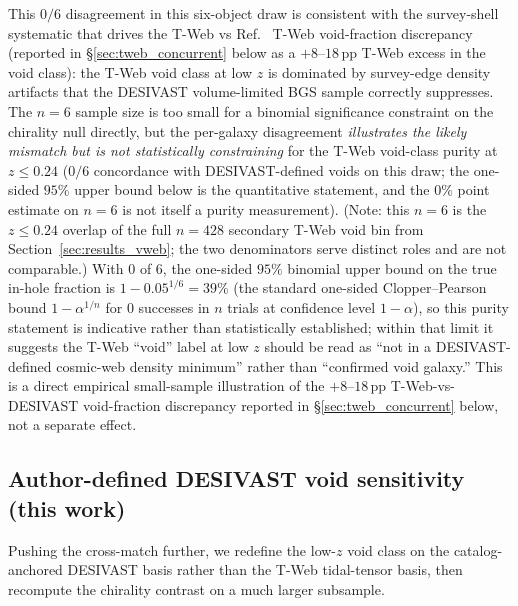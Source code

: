 \documentclass[aps,prd,twocolumn,superscriptaddress,showpacs,preprintnumbers,nofootinbib,longbibliography,floatfix]{revtex4-2}
\begin{document}
This $0/6$ disagreement in this six-object draw is consistent with the survey-shell systematic
that drives the T-Web vs Ref.~\cite{TWebDESI2026} T-Web void-fraction discrepancy
(reported in \S\ref{sec:tweb_concurrent} below as a
$+8$--$18\,$pp T-Web excess in the void class):
the T-Web void class at low $z$ is dominated by
survey-edge density artifacts that the DESIVAST volume-limited BGS
sample correctly suppresses. The $n = 6$ sample size is too small for
a binomial significance constraint on the chirality null directly, but
the per-galaxy disagreement \emph{illustrates the likely mismatch but is
not statistically constraining} for the T-Web void-class purity at
$z \leq 0.24$ ($0/6$ concordance with DESIVAST-defined voids on this
draw; the one-sided $95\%$ upper bound below is the quantitative
statement, and the $0\%$ point estimate on $n=6$ is not itself a purity
measurement). (Note: this $n=6$ is the $z \leq 0.24$ overlap of the full
$n=428$ secondary T-Web void bin from
Section~\ref{sec:results_vweb}; the two denominators serve distinct
roles and are not comparable.) With $0$ of $6$, the one-sided $95\%$ binomial upper bound on
the true in-hole fraction is $1 - 0.05^{1/6} = 39\%$ (the standard
one-sided Clopper--Pearson bound $1 - \alpha^{1/n}$ for $0$ successes in
$n$ trials at confidence level $1-\alpha$), so this purity
statement is indicative rather than statistically established;
within that limit it suggests the T-Web ``void'' label at low $z$
should be read as ``not in a DESIVAST-defined cosmic-web density
minimum'' rather than ``confirmed void galaxy.''
This is a direct empirical small-sample illustration of the
$+8$--$18\,$pp T-Web-vs-DESIVAST void-fraction discrepancy
reported in \S\ref{sec:tweb_concurrent} below,
not a separate effect.

\subsection{Author-defined DESIVAST void sensitivity (this work)}\label{sec:desivast_anchored_void}

Pushing the cross-match further, we redefine the low-$z$ void class on the
catalog-anchored DESIVAST basis rather than the T-Web tidal-tensor
basis, then recompute the chirality contrast on a much larger
subsample.
\end{document}
